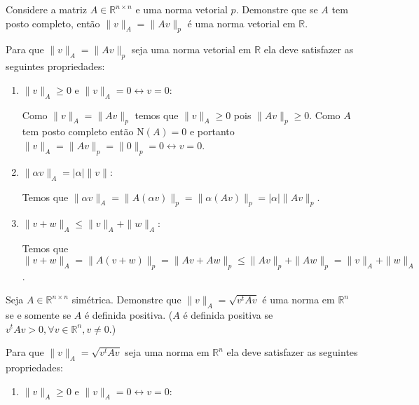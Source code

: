 % 
% 
% 
% 
% 
% 
%
%
\begin{questions}
    \question Considere a matriz $A \in \mathbb{R}^{n \times n}$ e uma norma vetorial $p$. Demonstre que se $A$ tem posto completo, ent\~{a}o $\| v \|_A = \| A v \|_p$ \'{e} uma norma vetorial em $\mathbb{R}$.
    \begin{solution}
        Para que $\| v \|_A = \| A v \|_p$ seja uma norma vetorial em $\mathbb{R}$ ela deve satisfazer as seguintes propriedades:
        \begin{enumerate}
            \item $\| v \|_A \geq 0$ e $\| v \|_A = 0 \leftrightarrow v = 0$:

                Como $\| v \|_A = \| A v \|_p$ temos que $\| v \|_A \geq 0$ pois $\| A v \|_p \geq 0$. Como $A$ tem posto completo ent\~{a}o $\text{N}(A) = 0$ e portanto $\| v \|_A = \| A v \|_p = \| 0 \|_p = 0 \leftrightarrow v = 0$.

            \item $\| \alpha v \|_A = | \alpha | \| v \|$:

                Temos que $\| \alpha v \|_A = \| A \left( \alpha v \right) \|_p = \| \alpha \left( A v \right) \|_p = | \alpha | \| A v \|_p$.

            \item $\| v + w \|_A \leq \| v \|_A + \| w \|_A$:

                Temos que $\| v + w \|_A = \| A \left( v + w \right) \|_p = \| A v + A w \|_p \leq \| A v \|_p + \| A w \|_p = \| v \|_A + \| w \|_A$.
        \end{enumerate}
    \end{solution}

    \question Seja $A \in \mathbb{R}^{n \times n}$ sim\'{e}trica. Demonstre que $\| v \|_A = \sqrt{v^t A v}$ \'{e} uma norma em $\mathbb{R}^n$ se e somente se $A$ \'{e} definida positiva. ($A$ \'{e} definida positiva se $v^t A v > 0, \forall v \in \mathbb{R}^n, v \neq 0$.)
    \begin{solution}
        Para que $\| v \|_A = \sqrt{v^t A v}$ seja uma norma em $\mathbb{R}^n$ ela deve satisfazer as seguintes propriedades:
        \begin{enumerate}
            \item $\| v \|_A \geq 0$ e $\| v \|_A = 0 \leftrightarrow v = 0$:


\end{enumerate}
\end{solution}
\end{questions}
